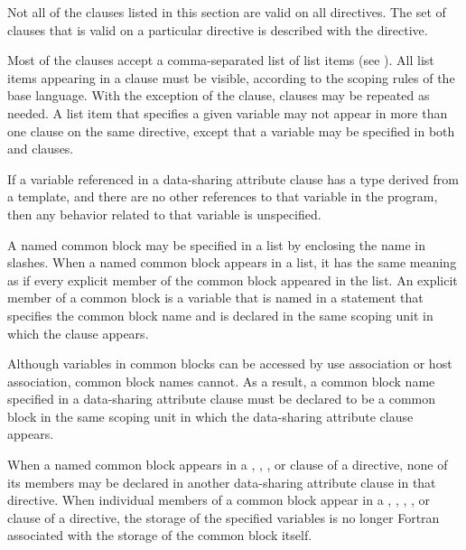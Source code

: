 {{{{Not all of the clauses listed in this section are valid on all directives. The set of clauses 
that is valid on a particular directive is described with the directive.

Most of the clauses accept a comma-separated list of list items (see 
). 
All list items appearing in a clause must be visible, according to the scoping rules 
of the base language. With the exception of the  clause, clauses may be 
repeated as needed. A list item that specifies a given variable may not appear in more 
than one clause on the same directive, except that a variable may be specified in both 
 and  clauses.

\cppspecificstart
If a variable referenced in a data-sharing attribute clause has a type derived from a 
template, and there are no other references to that variable in the program, then any 
behavior related to that variable is unspecified. 
\cppspecificend

\fortranspecificstart
A named common block may be specified in a list by enclosing the name in slashes. 
When a named common block appears in a list, it has the same meaning as if every 
explicit member of the common block appeared in the list. An explicit member of a 
common block is a variable that is named in a  statement that specifies the 
common block name and is declared in the same scoping unit in which the clause 
appears.

Although variables in common blocks can be accessed by use association or host 
association, common block names cannot. As a result, a common block name specified 
in a data-sharing attribute clause must be declared to be a common block in the same 
scoping unit in which the data-sharing attribute clause appears.

When a named common block appears in a , , 
, or  clause of a directive, none of its members may be declared 
in another data-sharing attribute clause in that directive. When individual members of a common block appear in a , , 
, , or  clause of a directive, the storage of the specified variables is no longer Fortran associated with the storage of the common block itself.
\fortranspecificend










}}}}
